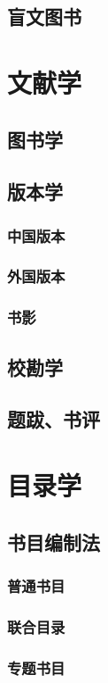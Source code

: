 \documentclass[UTF8]{../../ApplicationUniverse}
\begin{document}
\subsection{盲文图书}


\section{文献学}
\subsection{图书学}
\subsection{版本学}
    \subsubsection{中国版本}
    \subsubsection{外国版本}
    \subsubsection{书影}
\subsection{校勘学}
\subsection{题跋、书评}


\section{目录学}
\subsection{书目编制法}
    \subsubsection{普通书目}
    \subsubsection{联合目录}
    \subsubsection{专题书目}
\end{document}
